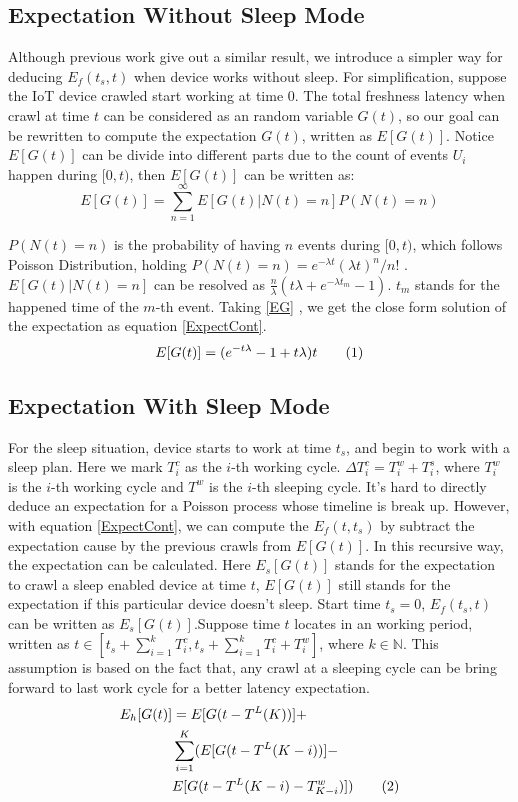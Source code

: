 \documentclass[conference]{IEEEtran}
\newcommand\numberthis{\addtocounter{equation}{1}\tag{\theequation}}
\begin{document}
\subsection{Expectation Without Sleep Mode}
Although previous work\cite{Cho2000} give out a similar result, we introduce a simpler way for deducing $E_f(t_s, t)$ when device works without sleep. For simplification, suppose the IoT device crawled start working at time $0$. The total freshness latency when crawl at time $t$ can be considered as an random variable $G(t)$, so our goal can be rewritten to compute the expectation $G(t)$, written as $E[G(t)]$. 
Notice $E[G(t)]$ can be divide into different parts due to the count of events $U_i$ happen during $[0, t)$, then $E[G(t)]$ can be written as:
\begin{equation}
E[G(t)] = \sum_{n=1}^{\infty} E[G(t)|N(t)=n]P(N(t)=n) \label{EG}
\end{equation}

$P(N(t)=n)$ is the probability of having $n$ events during $[0,t)$, which follows Poisson Distribution, holding $P(N(t)=n)=e^{-\lambda t}{(\lambda t)^n}/{n!}$ . $E[G(t)|N(t)=n]$ can be resolved as $\frac{n}{\lambda}(t\lambda+e^{-\lambda t_m}-1)$. $t_{m}$ stands for the happened time of the $m$-th event. Taking \eqref{EG} , we get the close form solution of the expectation as equation \eqref{ExpectCont}.
\begin{equation}
E[G(t)] = (e^{-t\lambda}-1+t \lambda)t \numberthis \label{ExpectCont}
\end{equation}

\subsection{Expectation With Sleep Mode}
For the sleep situation, device starts to work at time $t_s$, and begin to work with a sleep plan.
Here we mark $T^{c}_{i}$ as the $i$-th working cycle. $\Delta T^{c}_{i} = T^{w}_{i}+T^{s}_{i}$, where $T^{w}_{i}$ is the $i$-th working cycle and $T^{w}$ is the $i$-th sleeping cycle. 
It's hard to directly deduce an expectation for a Poisson process whose timeline is break up. However, with equation \eqref{ExpectCont}, we can compute the $E_f(t, t_s)$ by subtract the expectation cause by the previous crawls from $E[G(t)]$. In this recursive way, the expectation can be calculated. Here $E_s[G(t)]$ stands for the expectation to crawl a sleep enabled device at time $t$, $E[G(t)]$ still stands for the expectation if this particular device doesn't sleep.
Start time $t_s=0$, $E_f(t_s,t)$ can be written as $E_s[G(t)]$.Suppose time $t$ locates in an working period, written as $t \in [t_s + \sum_{i=1}^{k} T^{c}_{i}, t_s + \sum_{i=1}^{k} T^{c}_{i} + T^{w}_{i}]$, where $k\in\mathbb{N}$. This assumption is based on the fact that, any crawl at a sleeping cycle can be bring forward to last work cycle for a better latency expectation.
\begin{align*}
E_h[G(t)] & = E[G(t-T^{L}(K))] + \\
	& \sum_{i=1}^{K}(E[G(t-T^{L}(K-i))]-\\
	& E[G(t-T^{L}(K-i)-T^{w}_{K-i})]) \numberthis \label{ExpectSleep}
\end{align*}
\end{document}

